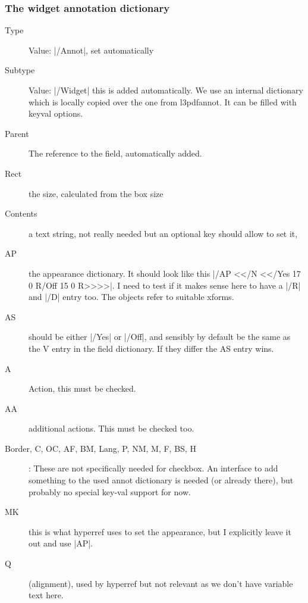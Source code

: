  \subsubsection{The widget annotation dictionary}

 \begin{description}
 \item[Type] Value: |/Annot|, set automatically
 \item[Subtype] Value: |/Widget| this is added automatically.
  We use an internal dictionary which is locally copied over the one from l3pdfannot.
  It can be filled with keyval options.
 \item[Parent] The reference to the field, automatically added.
 \item[Rect] the size, calculated from the box size
 \item[Contents] a text string, not really needed but an optional key should allow to
 set it,
 \item[AP] the appearance dictionary. It should look like this
  |/AP <</N <</Yes 17 0 R/Off 15 0 R>>>>|. I need to test if it makes sense here to
  have a |/R| and |/D| entry too. The objects refer to suitable xforms.
 \item[AS] should be either |/Yes| or |/Off|, and sensibly by default be
  the same as the V entry in the field dictionary. If they differ the AS entry wins.

 \item[A] Action, this must be checked.
 \item[AA] additional actions. This must be checked too.

 \item[Border, C, OC, AF, BM, Lang, P, NM, M, F, BS, H]: These are not specifically
 needed for checkbox. An interface to add something to the used annot dictionary
 is needed (or already there), but probably no special key-val support for now.

 \item[MK] this is what hyperref uses to set the appearance, but I
  explicitly leave it out and use |AP|.

 \item[Q] (alignment), used by hyperref but not relevant as we don't have variable
 text here.
 \end{description}




